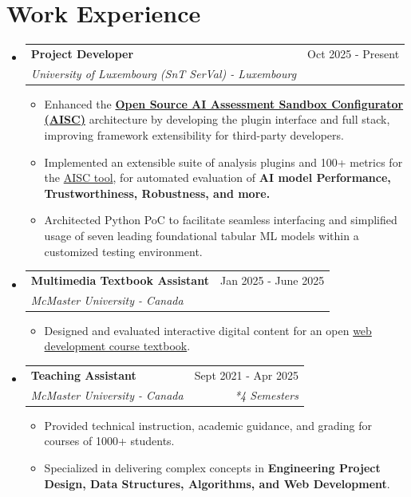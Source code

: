 \documentclass[a4paper,11pt]{article}
\makeatletter
\newcommand{\headingFour}[4]{
	\item
	\begin{tabular*}{0.97\textwidth}{l@{\extracolsep{\fill}}r}
	\textbf{\large\textcolor{customBlue}{#1}} & {#2} \\
	\textit{#3} & \textit{#4} \\
	\end{tabular*}\vspace{-6pt}
}
\makeatother
\begin{document}
\section{Work Experience}
\begin{itemize}[leftmargin=*]
\headingFour{Project Developer}{Oct 2025 - Present}
{University of Luxembourg (SnT SerVal) - Luxembourg}{~}
\begin{itemize}
	\item{Enhanced the \href{https://www.uni.lu/snt-en/news/new-open-source-tool-accelerates-testing-for-trustworthy-artificial-intelligence/}{\textbf{Open Source AI Assessment Sandbox Configurator (AISC)}} architecture by developing the plugin interface and full stack, improving framework extensibility for third-party developers.}\vspace{-2pt}
	\item{Implemented an extensible suite of analysis plugins and 100+ metrics for the \href{https://aifactory.lu/build-and-test/testing-the-solution/ai-sandbox-configurator}{AISC tool}, for automated evaluation of \textbf{AI model Performance, Trustworthiness, Robustness, and more.}}\vspace{-2pt}
	\item{Architected Python PoC to facilitate seamless interfacing and simplified usage of seven leading foundational tabular ML models within a customized testing environment.}\vspace{-2pt}
\end{itemize}

\headingFour{Multimedia Textbook Assistant}{Jan 2025 - June 2025}
{McMaster University - Canada}{~}
\begin{itemize}
	\item{Designed and evaluated interactive digital content for an open \href{https://ecampusontario.pressbooks.pub/webdev/}{web development course textbook}.}\vspace{-2pt}
\end{itemize}

\headingFour{Teaching Assistant}{Sept 2021 - Apr 2025}
{McMaster University - Canada}{*4 Semesters}
\begin{itemize}
	\item{Provided technical instruction, academic guidance, and grading for courses of 1000+ students.}\vspace{-2pt}
	\item{Specialized in delivering complex concepts in \textbf{Engineering Project Design, Data Structures, Algorithms, and Web Development}.}\vspace{-2pt}
\end{itemize}


\end{itemize}
\end{document}
